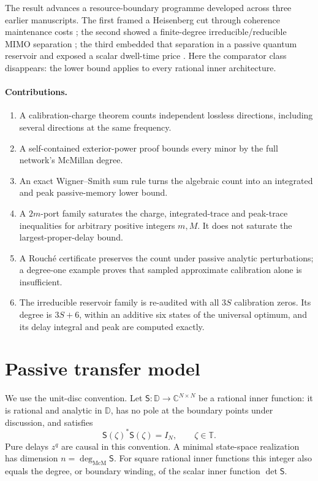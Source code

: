 \documentclass[11pt]{article}
\theoremstyle{definition}
\theoremstyle{remark}
\newcommand{\C}{\mathbb{C}}
\newcommand{\T}{\mathbb{T}}
\newcommand{\D}{\mathbb{D}}
\newcommand{\mcdeg}{\deg_{\mathrm{McM}}}
\begin{document}
The result advances a resource-boundary programme developed across three
earlier manuscripts.  The first framed a Heisenberg cut through coherence
maintenance costs \cite{ErikssonCut2026}; the second showed a finite-degree
irreducible/reducible MIMO separation \cite{ErikssonMIMO2026}; the third
embedded that separation in a passive quantum reservoir and exposed a scalar
dwell-time price \cite{ErikssonReservoir2026}.  Here the comparator class
disappears: the lower bound applies to every rational inner architecture.

\paragraph{Contributions.}
\begin{enumerate}
 \item A calibration-charge theorem counts independent lossless directions,
 including several directions at the same frequency.
 \item A self-contained exterior-power proof bounds every minor by the full
 network's McMillan degree.
 \item An exact Wigner--Smith sum rule turns the algebraic count into an
 integrated and peak passive-memory lower bound.
 \item A $2m$-port family saturates the charge, integrated-trace and
 peak-trace inequalities for arbitrary positive integers $m,M$. It does not
 saturate the largest-proper-delay bound.
 \item A Rouch\'e certificate preserves the count under passive analytic
 perturbations; a degree-one example proves that sampled approximate
 calibration alone is insufficient.
 \item The irreducible reservoir family is re-audited with all $3S$
 calibration zeros.  Its degree is $3S+6$, within an additive six states of
 the universal optimum, and its delay integral and peak are computed exactly.
\end{enumerate}

\section{Passive transfer model}

We use the unit-disc convention.  Let $\mathsf S:\D\to\C^{N\times N}$ be a
rational inner function: it is rational and analytic in $\D$, has no pole at
the boundary points under discussion, and satisfies
\begin{equation}\label{eq:inner}
 \mathsf S(\zeta)^*\mathsf S(\zeta)=I_N,
 \qquad \zeta\in\T.
\end{equation}
Pure delays $z^q$ are causal in this convention.  A minimal state-space
realization has dimension $n=\mcdeg\mathsf S$.  For square rational inner
functions this integer also equals the degree, or boundary winding, of the
scalar inner function $\det\mathsf S$.
\end{document}
